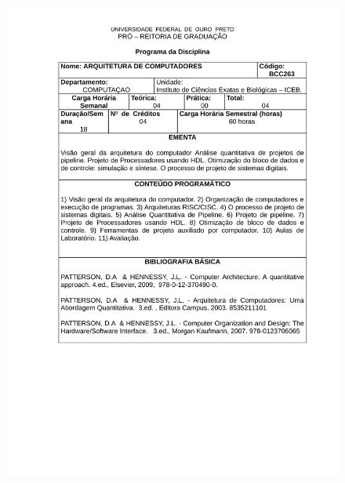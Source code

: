 \begin{figure}[p]
	\centering 
	\includegraphics[scale=0.7]{capitulos/anexo1-programas-disciplina/eg31.pdf}
\end{figure}

